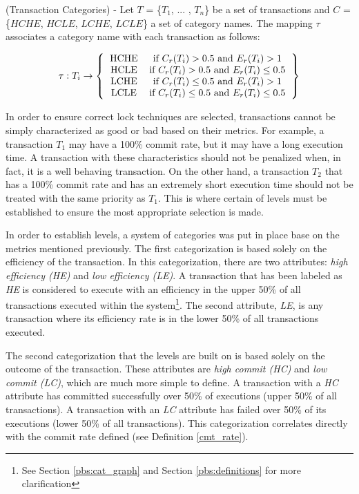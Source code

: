 \begin{definition}
\label{transaction_categories}
(Transaction Categories) - Let $T$ = \{$T_{1}$, ... , $T_{n}$\} be a set of transactions and $C$ = \{$HCHE$, $HCLE$, $LCHE$, $LCLE$\} a set of category names. The mapping $\tau$ associates a category name with each transaction as follows:

\[ 
\tau : \textrm{$T_{i}$}\rightarrow
\left \{
  \begin{tabular}{cc}
  HCHE & if $C_{r}(T_{i}) > 0.5$ and $E_{r}(T_{i}) > 1$ \\
  HCLE & if $C_{r}(T_{i}) > 0.5$ and $E_{r}(T_{i}) \le 0.5$ \\
  LCHE & if $C_{r}(T_{i}) \le 0.5$ and $E_{r}(T_{i}) > 1$ \\
  LCLE & if $C_{r}(T_{i}) \le 0.5$ and $E_{r}(T_{i}) \le 0.5$
  \end{tabular}
\right \}
\]

{\normalfont In order to ensure correct lock techniques are selected, transactions cannot be simply characterized as good or bad based on their metrics. For example, a transaction $T_{1}$ may have a 100\% commit rate, but it may have a long execution time. A transaction with these characteristics should not be penalized when, in fact, it is a well behaving transaction. On the other hand, a transaction $T_{2}$ that has a 100\% commit rate and has an extremely short execution time should not be treated with the same priority as $T_{1}$. This is where certain of levels must be established to ensure the most appropriate selection is made.

In order to establish levels, a system of categories was put in place base on the metrics mentioned previously. The first categorization is based solely on the efficiency of the transaction. In this categorization, there are two attributes: \textit{high efficiency (HE)} and \textit{low efficiency (LE)}. A transaction that has been labeled as \textit{HE} is considered to execute with an efficiency in the upper 50\% of all transactions executed within the system\footnote{See Section \ref{pbs:cat_graph} and Section \ref{pbs:definitions} for more clarification}. The second attribute, \textit{LE}, is any transaction where its efficiency rate is in the lower 50\% of all transactions executed.

The second categorization that the levels are built on is based solely on the outcome of the transaction. These attributes are \textit{high commit (HC)} and \textit{low commit (LC)}, which are much more simple to define. A transaction with a \textit{HC} attribute has committed successfully over 50\% of executions (upper 50\% of all transactions). A transaction with an \textit{LC} attribute has failed over 50\% of its executions (lower 50\% of all transactions). This categorization correlates directly with the commit rate defined (see Definition \ref{cmt_rate}).

}
\end{definition}
